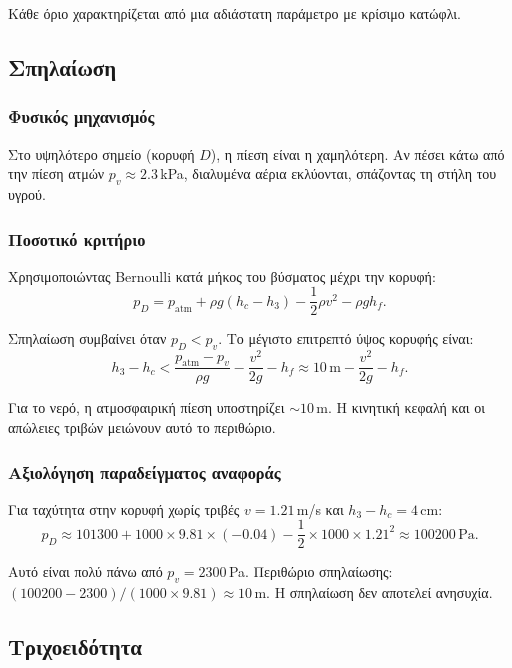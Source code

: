 \documentclass[11pt]{article}
\begin{document}
Κάθε όριο χαρακτηρίζεται από μια αδιάστατη παράμετρο με κρίσιμο κατώφλι.

\subsection{Σπηλαίωση}

\subsubsection{Φυσικός μηχανισμός}

Στο υψηλότερο σημείο (κορυφή $D$), η πίεση είναι η χαμηλότερη. Αν πέσει κάτω από την πίεση ατμών $p_v \approx 2.3$\,kPa, διαλυμένα αέρια εκλύονται, σπάζοντας τη στήλη του υγρού.

\subsubsection{Ποσοτικό κριτήριο}

Χρησιμοποιώντας Bernoulli κατά μήκος του βύσματος μέχρι την κορυφή:
\[
  p_D = p_{\text{atm}} + \rho g(h_c - h_3) - \frac{1}{2}\rho v^2 - \rho g h_f.
\]

Σπηλαίωση συμβαίνει όταν $p_D < p_v$. Το μέγιστο επιτρεπτό ύψος κορυφής είναι:
\begin{equation}
  h_3 - h_c < \frac{p_{\text{atm}} - p_v}{\rho g} - \frac{v^2}{2g} - h_f \approx 10\,\text{m} - \frac{v^2}{2g} - h_f.
  \label{eq:cavitation-criterion}
\end{equation}

Για το νερό, η ατμοσφαιρική πίεση υποστηρίζει $\sim 10$\,m. Η κινητική κεφαλή και οι απώλειες τριβών μειώνουν αυτό το περιθώριο.

\subsubsection{Αξιολόγηση παραδείγματος αναφοράς}

Για ταχύτητα στην κορυφή χωρίς τριβές $v = 1.21$\,m/s και $h_3 - h_c = 4$\,cm:
\[
  p_D \approx 101300 + 1000 \times 9.81 \times (-0.04) - \frac{1}{2} \times 1000 \times 1.21^2 \approx 100200\,\text{Pa}.
\]

Αυτό είναι πολύ πάνω από $p_v = 2300$\,Pa. Περιθώριο σπηλαίωσης: $(100200 - 2300)/(1000 \times 9.81) \approx 10$\,m. Η σπηλαίωση δεν αποτελεί ανησυχία.

\subsection{Τριχοειδότητα}
\end{document}
